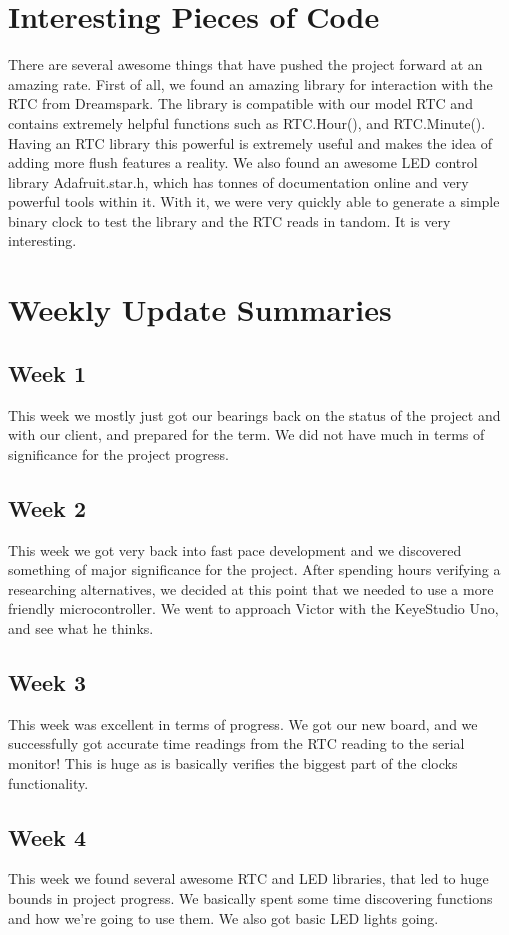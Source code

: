 \documentclass[onecolumn, draftclsnofoot,10pt, compsoc]{IEEEtran}
\begin{document}
\section{Interesting Pieces of Code}
There are several awesome things that have pushed the project forward at an amazing rate.
First of all, we found an amazing library for interaction with the RTC from Dreamspark.
The library is compatible with our model RTC and contains extremely helpful functions such as RTC.Hour(), and RTC.Minute().
Having an RTC library this powerful is extremely useful and makes the idea of adding more flush features a reality.
We also found an awesome LED control library Adafruit.star.h, which has tonnes of documentation online and very powerful tools within it.
With it, we were very quickly able to generate a simple binary clock to test the library and the RTC reads in tandom.
It is very interesting.

\section{Weekly Update Summaries}
\subsection{Week 1}
This week we mostly just got our bearings back on the status of the project and with our client, and prepared for the term.
We did not have much in terms of significance for the project progress.

\subsection{Week 2}
This week we got very back into fast pace development and we discovered something of major significance for the project.
After spending hours verifying a researching alternatives, we decided at this point that we needed to use a more friendly microcontroller.
We went to approach Victor with the KeyeStudio Uno, and see what he thinks.

\subsection{Week 3}
This week was excellent in terms of progress.
We got our new board, and we successfully got accurate time readings from the RTC reading to the serial monitor!
This is huge as is basically verifies the biggest part of the clocks functionality.

\subsection{Week 4}
This week we found several awesome RTC and LED libraries, that led to huge bounds in project progress.
We basically spent some time discovering functions and how we're going to use them.
We also got basic LED lights going.
\end{document}
